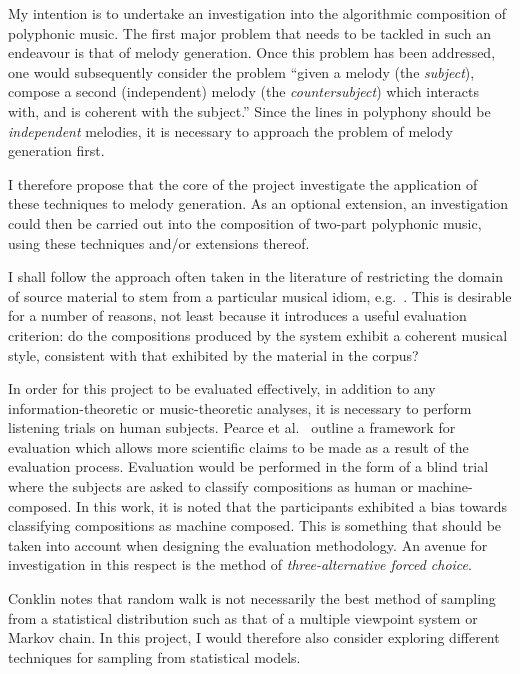 \documentclass[12pt,a4paper,twoside]{article}
\begin{document}
My intention is to undertake an investigation into the algorithmic composition
of polyphonic music. The first major problem that needs to be tackled in such an
endeavour is that of melody generation. Once this problem has been addressed,
one would subsequently consider the problem ``given a melody (the
\emph{subject}), compose a second (independent) melody (the
\emph{countersubject}) which interacts with, and is coherent with the subject.''
Since the lines in polyphony should be \emph{independent} melodies, it is
necessary to approach the problem of melody generation first.

I therefore propose that the core of the project investigate the application of
these techniques to melody generation. As an optional extension, an
investigation could then be carried out into the composition of two-part
polyphonic music, using these techniques and/or extensions thereof.

I shall follow the approach often taken in the literature of restricting the
domain of source material to stem from a particular musical idiom, e.g.\
\cite{pearce2001evaluation}. This is desirable for a number of reasons, not
least because it introduces a useful evaluation criterion: do the compositions
produced by the system exhibit a coherent musical style, consistent with that
exhibited by the material in the corpus?

In order for this project to be evaluated effectively, in addition to any
information-theoretic or music-theoretic analyses, it is necessary to perform
listening trials on human subjects. Pearce et al.\ \cite{pearce2001evaluation}
outline a framework for evaluation which allows more scientific claims to be
made as a result of the evaluation process. Evaluation would be performed in the
form of a blind trial where the subjects are asked to classify compositions as
human or machine-composed. In this work, it is noted that the participants
exhibited a bias towards classifying compositions as machine composed. This is
something that should be taken into account when designing the evaluation
methodology. An avenue for investigation in this respect is the method of
\emph{three-alternative forced choice}.

Conklin \cite{conklin2003music} notes that random walk is not necessarily the
best method of sampling from a statistical distribution such as that of a
multiple viewpoint system or Markov chain. In this project, I would therefore
also consider exploring different techniques for sampling from statistical
models.
 
\end{document}

